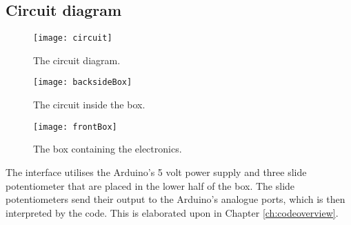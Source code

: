 	
	\subsection{Circuit diagram}\label{sub:circuitdiagram}
\begin{figure}
\centering
\texttt{[image: circuit]}
\caption{The circuit diagram.}
\label{fig:circuit}
\end{figure}

\begin{figure}
\centering
\texttt{[image: backsideBox]}
\caption{The circuit inside the box.}
\label{fig:backsideBox}
\end{figure}

\begin{figure}
\centering
\texttt{[image: frontBox]}
\caption{The box containing the electronics.}
\label{fig:frontBox}
\end{figure}

	
	The interface utilises the Arduino's 5 volt power supply and three slide potentiometer that are placed in the lower half of the box. The slide potentiometers send their output to the Arduino's analogue ports, which is then interpreted by the code. This is elaborated upon in Chapter \ref{ch:codeoverview}.
